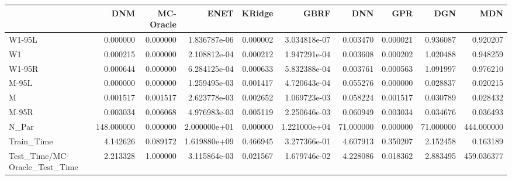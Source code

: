 \begin{tabular}{lrrrrrrrrr}
\toprule
{} &         DNM &  MC-Oracle &          ENET &    KRidge &          GBRF &        DNN &       GPR &        DGN &         MDN \\
\midrule
W1-95L                        &    0.000000 &   0.000000 &  1.836787e-06 &  0.000002 &  3.034818e-07 &   0.003470 &  0.000021 &   0.936087 &    0.920207 \\
W1                            &    0.000215 &   0.000000 &  2.108812e-04 &  0.000212 &  1.947291e-04 &   0.003608 &  0.000202 &   1.020488 &    0.948259 \\
W1-95R                        &    0.000644 &   0.000000 &  6.284125e-04 &  0.000633 &  5.832388e-04 &   0.003761 &  0.000563 &   1.091997 &    0.976210 \\
M-95L                         &    0.000000 &   0.000000 &  1.259495e-03 &  0.001417 &  4.720643e-04 &   0.055276 &  0.000000 &   0.028837 &    0.020215 \\
M                             &    0.001517 &   0.001517 &  2.623778e-03 &  0.002652 &  1.069723e-03 &   0.058224 &  0.001517 &   0.030789 &    0.028432 \\
M-95R                         &    0.003034 &   0.006068 &  4.976983e-03 &  0.005119 &  2.250646e-03 &   0.060949 &  0.003034 &   0.034676 &    0.036493 \\
N\_Par                         &  148.000000 &   0.000000 &  2.000000e+01 &  0.000000 &  1.221000e+04 &  71.000000 &  0.000000 &  71.000000 &  444.000000 \\
Train\_Time                    &    4.142626 &   0.089172 &  1.619880e+09 &  0.466945 &  3.277366e-01 &   4.607913 &  0.350207 &   2.152458 &    0.163189 \\
Test\_Time/MC-Oracle\_Test\_Time &    2.213328 &   1.000000 &  3.115864e-03 &  0.021567 &  1.679746e-02 &   4.228086 &  0.018362 &   2.883495 &  459.036377 \\
\bottomrule
\end{tabular}
